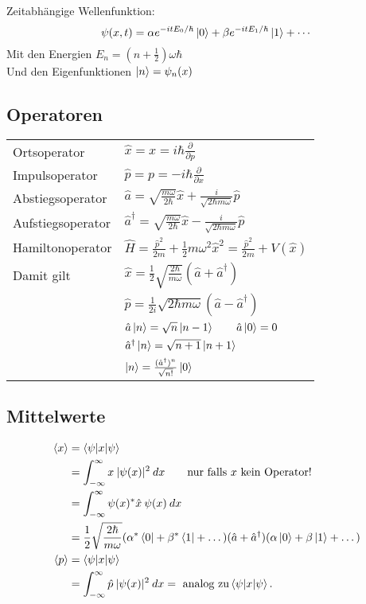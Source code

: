 \documentclass[landscape,8pt]{scrartcl}
\begin{document}
\begin{multicols}{3}

\noindent Zeitabhängige Wellenfunktion:
\[
	\psi(x,t)
		= \alpha e^{-itE_0/\hbar}\ket 0 
		+ \beta  e^{-itE_1/\hbar}\ket 1  
		+ \cdots
\]
Mit den Energien $E_n = \left(n+\frac 12\right) \omega \hbar $ \\
Und den Eigenfunktionen $\ket n = \psi_n(x)$\\

\subsection{Operatoren}
\begin{tabular}{ll}
Ortsoperator 			& $\hat x = x = i \hbar \frac{\partial}{\partial p}$	\\
Impulsoperator 			& $\hat p = p = -i\hbar \frac{\partial}{\partial x}$	\\
Abstiegsoperator 		& $\hat a = \sqrt{\frac{m \omega}{2\hbar}} \hat x + \frac{i}{\sqrt{2\hbar m \omega}} \hat p$	\\
Aufstiegsoperator 		& $\hat a^\dagger = \sqrt{\frac{m \omega}{2\hbar}} \hat x - \frac{i}{\sqrt{2\hbar m \omega}} \hat p$ \\
Hamiltonoperator		& $\hat H=\frac{\hat p^2}{2m}+\frac{1}{2}m\omega^2\hat x^2 = \frac{\hat p^2}{2m} + V(\hat x)$	\\
Damit gilt				& $\hat x  = \frac 12 \sqrt{\frac{2\hbar}{m\omega}}(\hat a + \hat a^\dagger) $ \\
						& $\hat p  = \frac 1{2i} \sqrt {2\hbar m \omega} (\hat a - \hat a^\dagger) $\\
						& $\hat a\ket n = \sqrt{n}\ket{n-1} \qquad \hat a \ket 0 = 0$ \\
						& $\hat a^\dagger \ket n = \sqrt{n+1}\ket {n+1}$	\\
						& $\ket n = \frac{(\hat a^\dagger)^n}{\sqrt {n!}} \ket 0 $
\end{tabular}

\subsection{Mittelwerte}
\begin{align*}
\braket{x} 	&=\braket{\psi|x|\psi}\\
			&=\int_{-\infty}^{\infty} x\:|\psi(x)|^2\:dx\qquad\text{nur falls } x \text{ kein Operator!}\\
			&=\int_{-\infty}^{\infty} \psi(x)^\ast \hat x\:\psi(x)\:dx		\\
			&=\frac 12 \sqrt{\frac{2\hbar}{m\omega}}(\alpha^\ast \bra 0 + \beta^\ast \bra 1 + \dots) (\hat a + \hat a^\dagger) (\alpha \ket 0 + \beta \ket 1 + \dots) \\
\braket{p}	&=\braket{\psi|x|\psi}	\\
			&=\int_{-\infty}^{\infty} \hat p\:|\psi(x)|^2\:dx= \text{ analog zu}\braket{\psi|x|\psi}\text{.}	\\
\end{align*}



\end{multicols}
\end{document}
